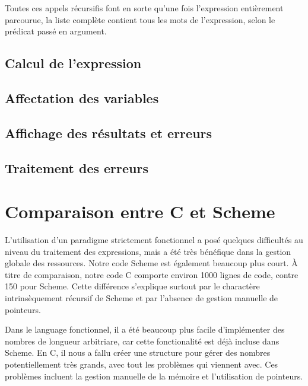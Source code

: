 \documentclass[letterpaper,12pt]{scrartcl}
\begin{document}
        Toutes ces appels récursifis font en sorte qu'une fois l'expression entièrement parcourue, la liste complète contient tous les mots de l'expression, selon le prédicat passé en argument.
        \subsection{Calcul de l'expression}
        
        \subsection{Affectation des variables}
        
        \subsection{Affichage des résultats et erreurs}
        
        \subsection{Traitement des erreurs}
		
	\section{Comparaison entre C et Scheme}
	
	L'utilisation d'un paradigme strictement fonctionnel a posé quelques difficultés au niveau du 			traitement des expressions, mais a été très bénéfique dans la gestion globale des ressources. Notre code Scheme est également beaucoup plus court. À titre de comparaison, notre code C comporte environ 1000 lignes de code, contre 150 pour Scheme. Cette différence s'explique surtout par le charactère intrinsèquement récursif de Scheme et par l'absence de gestion manuelle de pointeurs.
	
	Dans le language fonctionnel, il a été beaucoup plus facile d'implémenter des nombres de longueur arbitriare, car cette fonctionalité est déjà incluse dans Scheme. En C, il nous a fallu créer une structure pour gérer des nombres potentiellement très grands, avec tout les problèmes qui viennent avec. Ces problèmes incluent la gestion manuelle de la mémoire et l'utilisation de pointeurs.
	
\end{document}
